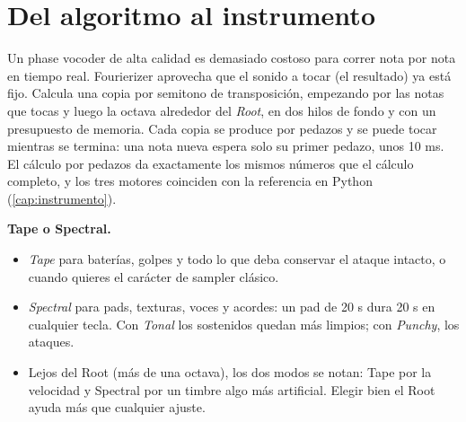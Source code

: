 \section{Del algoritmo al instrumento}

Un phase vocoder de alta calidad es demasiado costoso para correr nota por nota en tiempo real.
Fourierizer aprovecha que el sonido a tocar (el resultado) ya está fijo. Calcula una copia por
semitono de transposición, empezando por las notas que tocas y luego la octava alrededor del
\emph{Root}, en dos hilos de fondo y con un presupuesto de memoria. Cada copia se produce por
pedazos y se puede tocar mientras se termina: una nota nueva espera solo su primer pedazo, unos
10 ms. El cálculo por pedazos da exactamente los mismos números que el cálculo completo, y los
tres motores coinciden con la referencia en Python (\cref{cap:instrumento}).

\begin{estudio}
\textbf{Tape o Spectral.}
\begin{itemize}
  \item \emph{Tape} para baterías, golpes y todo lo que deba conservar el ataque intacto, o cuando
        quieres el carácter de sampler clásico.
  \item \emph{Spectral} para pads, texturas, voces y acordes: un pad de 20 s dura 20 s en cualquier
        tecla. Con \emph{Tonal} los sostenidos quedan más limpios; con \emph{Punchy}, los ataques.
  \item Lejos del Root (más de una octava), los dos modos se notan: Tape por la velocidad y
        Spectral por un timbre algo más artificial. Elegir bien el Root ayuda más que cualquier
        ajuste.
\end{itemize}
\end{estudio}
